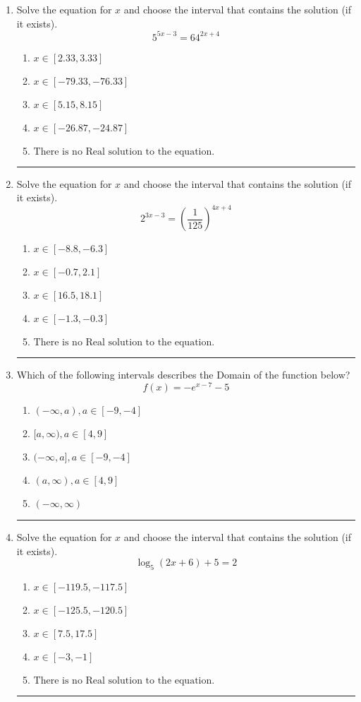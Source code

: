\documentclass[14pt]{extbook}
\newcommand{\litem}[1]{\item#1\hspace*{-1cm}\rule{\textwidth}{0.4pt}}
\begin{document}
\begin{enumerate}
{\begin{enumerate}[label=\Alph*.]
\end{enumerate} }
\litem{
Solve the equation for $x$ and choose the interval that contains the solution (if it exists).\[ 5^{5x-3} = 64^{2x+4} \]\begin{enumerate}[label=\Alph*.]
\item \( x \in [2.33, 3.33] \)
\item \( x \in [-79.33, -76.33] \)
\item \( x \in [5.15, 8.15] \)
\item \( x \in [-26.87, -24.87] \)
\item \( \text{There is no Real solution to the equation.} \)

\end{enumerate} }
\litem{
Solve the equation for $x$ and choose the interval that contains the solution (if it exists).\[ 2^{3x-3} = \left(\frac{1}{125}\right)^{4x+4} \]\begin{enumerate}[label=\Alph*.]
\item \( x \in [-8.8, -6.3] \)
\item \( x \in [-0.7, 2.1] \)
\item \( x \in [16.5, 18.1] \)
\item \( x \in [-1.3, -0.3] \)
\item \( \text{There is no Real solution to the equation.} \)

\end{enumerate} }
\litem{
Which of the following intervals describes the Domain of the function below?\[ f(x) = -e^{x-7}-5 \]\begin{enumerate}[label=\Alph*.]
\item \( (-\infty, a), a \in [-9, -4] \)
\item \( [a, \infty), a \in [4, 9] \)
\item \( (-\infty, a], a \in [-9, -4] \)
\item \( (a, \infty), a \in [4, 9] \)
\item \( (-\infty, \infty) \)

\end{enumerate} }
\litem{
Solve the equation for $x$ and choose the interval that contains the solution (if it exists).\[ \log_{5}{(2x+6)}+5 = 2 \]\begin{enumerate}[label=\Alph*.]
\item \( x \in [-119.5, -117.5] \)
\item \( x \in [-125.5, -120.5] \)
\item \( x \in [7.5, 17.5] \)
\item \( x \in [-3, -1] \)
\item \( \text{There is no Real solution to the equation.} \)


\end{enumerate}}
\end{enumerate}
\end{document}
